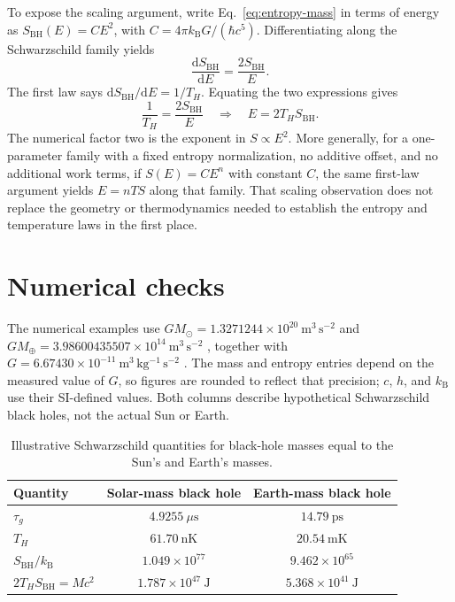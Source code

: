 \documentclass[12pt]{article}
\begin{document}
To expose the scaling argument, write Eq.~\eqref{eq:entropy-mass} in terms of energy as $S_{\mathrm{BH}}(E)=C E^2$, with $C=4\pi k_{\mathrm B}G/(\hbar c^5)$. Differentiating along the Schwarzschild family yields
\begin{equation}
  \frac{\mathrm{d}S_{\mathrm{BH}}}{\mathrm{d}E}
  =\frac{2S_{\mathrm{BH}}}{E}.
  \label{eq:entropy-slope}
\end{equation}
The first law says $\mathrm{d}S_{\mathrm{BH}}/\mathrm{d}E=1/T_H$. Equating the two expressions gives
\begin{equation}
  \frac{1}{T_H}=\frac{2S_{\mathrm{BH}}}{E}
  \quad\Longrightarrow\quad
  E=2T_HS_{\mathrm{BH}}.
  \label{eq:scaling-derivation}
\end{equation}
The numerical factor two is the exponent in $S\propto E^2$. More generally, for a one-parameter family with a fixed entropy normalization, no additive offset, and no additional work terms, if $S(E)=C E^n$ with constant $C$, the same first-law argument yields $E=nTS$ along that family. That scaling observation does not replace the geometry or thermodynamics needed to establish the entropy and temperature laws in the first place.

\section{Numerical checks}

The numerical examples use $GM_{\odot}=1.3271244\times10^{20}\ \mathrm{m^3\,s^{-2}}$ and $GM_{\oplus}=3.98600435507\times10^{14}\ \mathrm{m^3\,s^{-2}}$ \cite{JPL}, together with $G=6.67430\times10^{-11}\ \mathrm{m^3\,kg^{-1}\,s^{-2}}$ \cite{CODATA}. The mass and entropy entries depend on the measured value of $G$, so figures are rounded to reflect that precision; $c$, $h$, and $k_{\mathrm B}$ use their SI-defined values. Both columns describe hypothetical Schwarzschild black holes, not the actual Sun or Earth.

\begin{table}[ht]
  \centering
  \caption{Illustrative Schwarzschild quantities for black-hole masses equal to the Sun's and Earth's masses.}
  \label{tab:examples}
  \begin{tabular}{lcc}
    \toprule
    Quantity & Solar-mass black hole & Earth-mass black hole \\
    \midrule
    $\tau_g$ & $4.9255\ \mu\mathrm{s}$ & $14.79\ \mathrm{ps}$ \\
    $T_H$ & $61.70\ \mathrm{nK}$ & $20.54\ \mathrm{mK}$ \\
    $S_{\mathrm{BH}}/k_{\mathrm B}$ & $1.049\times10^{77}$ & $9.462\times10^{65}$ \\
    $2T_HS_{\mathrm{BH}}=Mc^2$ & $1.787\times10^{47}\ \mathrm{J}$ & $5.368\times10^{41}\ \mathrm{J}$ \\
    \bottomrule
  \end{tabular}
\end{table}
\end{document}
